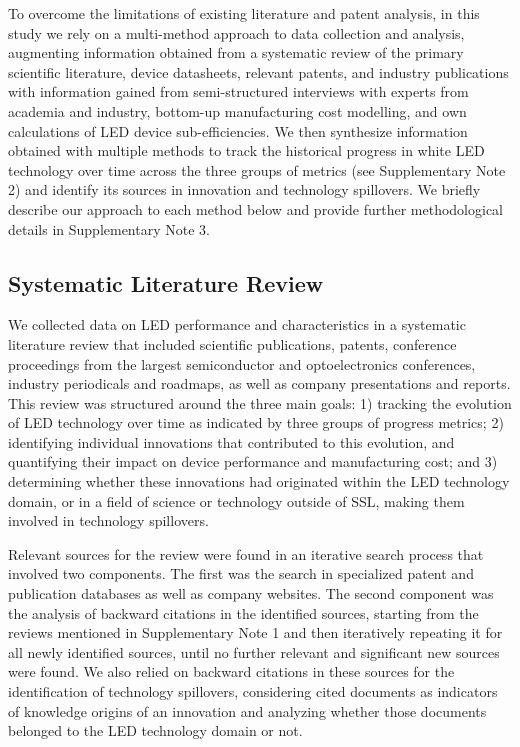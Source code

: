 \documentclass[parskip=full]{article}
\begin{document}
To overcome the limitations of existing literature and patent analysis, in this study we rely on a multi-method approach to data collection and analysis, augmenting information obtained from a systematic review of the primary scientific literature, device datasheets, relevant patents, and industry publications with information gained from semi-structured interviews with experts from academia and industry, bottom-up manufacturing cost modelling, and own calculations of LED device sub-efficiencies. We then synthesize information obtained with multiple methods to track the historical progress in white LED technology over time across the three groups of metrics (see Supplementary Note 2) and identify its sources in innovation and technology spillovers. We briefly describe our approach to each method below and provide further methodological details in Supplementary Note 3. 

\subsection{Systematic Literature Review}

We collected data on LED performance and characteristics in a systematic literature review that included scientific publications, patents, conference proceedings from the largest semiconductor and optoelectronics conferences, industry periodicals and roadmaps, as well as company presentations and reports. This review was structured around the three main goals: 1) tracking the evolution of LED technology over time as indicated by three groups of progress metrics; 2) identifying individual innovations that contributed to this evolution, and quantifying their impact on device performance and manufacturing cost; and 3) determining whether these innovations had originated within the LED technology domain, or in a field of science or technology outside of SSL, making them involved in technology spillovers.

Relevant sources for the review were found in an iterative search process that involved two components. The first was the search in specialized patent and publication databases as well as company websites. The second component was the analysis of backward citations in the identified sources, starting from the reviews mentioned in Supplementary Note 1 and then iteratively repeating it for all newly identified sources, until no further relevant and significant new sources were found. We also relied on backward citations in these sources for the identification of technology spillovers, considering cited documents as indicators of knowledge origins of an innovation and analyzing whether those documents belonged to the LED technology domain or not.
\end{document}
